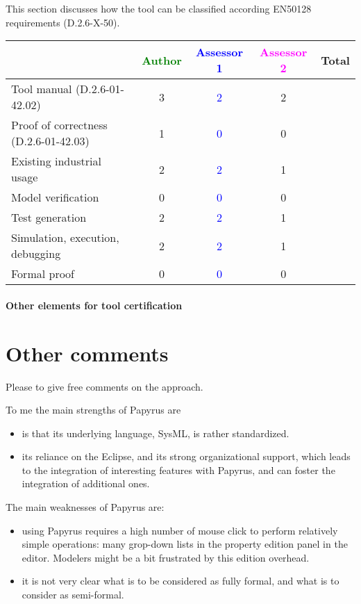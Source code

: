 This section discusses how the tool can be classified according EN50128 requirements (D.2.6-X-50).


\begin{tabular}{|l | c | c | c | c|}
\hline
& \textcolor{green}{Author} & \textcolor{blue}{Assessor 1} & \textcolor{magenta}{Assessor 2} & Total \\
\hline
Tool manual (D.2.6-01-42.02) & 3 & \textcolor{blue}{2} & 2 & \\
\hline
Proof of correctness (D.2.6-01-42.03) & 1 & \textcolor{blue}{0} & 0  & \\
\hline
Existing industrial usage & 2 & \textcolor{blue}{2} & 1 & \\
\hline
Model verification & 0 & \textcolor{blue}{0} & 0 & \\
\hline
Test generation & 2 & \textcolor{blue}{2} & 1 & \\
\hline
Simulation, execution, debugging & 2 & \textcolor{blue}{2} & 1 & \\
\hline
Formal proof & 0 & \textcolor{blue}{0} & 0 & \\
\hline
\end{tabular}

\paragraph{Other elements for tool certification}

\section{Other comments}
Please to give free comments on the approach.

\begin{assessor1}
To me the main strengths of Papyrus are
\begin{itemize}
\item is that its underlying language, SysML, is rather standardized. 
\item its reliance on the Eclipse, and its strong organizational support, which leads to the integration of interesting features with Papyrus, and can foster the integration of additional ones. 
\end{itemize}

The main weaknesses of Papyrus are: 
\begin{itemize}
\item using Papyrus requires a high number of mouse click to perform relatively simple operations: many grop-down lists in the property edition panel in the editor. Modelers might be a bit frustrated by this edition overhead. 
\item it is not very clear what is to be considered as fully formal, and what is to consider as semi-formal.  
\end{itemize}
\end{assessor1}

